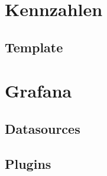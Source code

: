 \section{Kennzahlen}


\subsection{Template}


\section{Grafana}


\subsection{Datasources}


\subsection{Plugins}